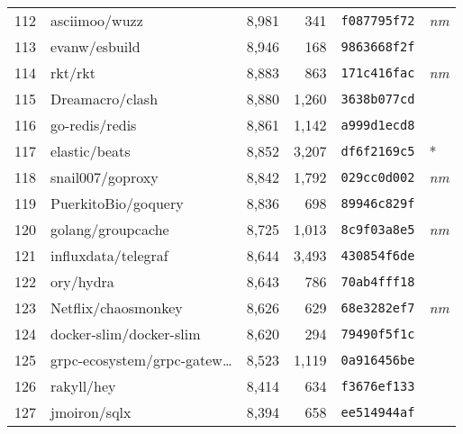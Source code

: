{\begin{supertabular}{llrrll}
        112 &                      asciimoo/wuzz &  8,981 &    341 &  \texttt{f087795f72} &  \textit{nm} \\
        113 &                      evanw/esbuild &  8,946 &    168 &  \texttt{9863668f2f} &              \\
        114 &                            rkt/rkt &  8,883 &    863 &  \texttt{171c416fac} &  \textit{nm} \\
        115 &                    Dreamacro/clash &  8,880 &  1,260 &  \texttt{3638b077cd} &              \\
        116 &                     go-redis/redis &  8,861 &  1,142 &  \texttt{a999d1ecd8} &              \\
        117 &                      elastic/beats &  8,852 &  3,207 &  \texttt{df6f2169c5} &            * \\
        118 &                   snail007/goproxy &  8,842 &  1,792 &  \texttt{029cc0d002} &  \textit{nm} \\
        119 &                PuerkitoBio/goquery &  8,836 &    698 &  \texttt{89946c829f} &              \\
        120 &                  golang/groupcache &  8,725 &  1,013 &  \texttt{8c9f03a8e5} &  \textit{nm} \\
        121 &                influxdata/telegraf &  8,644 &  3,493 &  \texttt{430854f6de} &              \\
        122 &                          ory/hydra &  8,643 &    786 &  \texttt{70ab4fff18} &              \\
        123 &                Netflix/chaosmonkey &  8,626 &    629 &  \texttt{68e3282ef7} &  \textit{nm} \\
        124 &            docker-slim/docker-slim &  8,620 &    294 &  \texttt{79490f5f1c} &              \\
        125 &    grpc-ecosystem/grpc-gatew\ldots &  8,523 &  1,119 &  \texttt{0a916456be} &              \\
        126 &                         rakyll/hey &  8,414 &    634 &  \texttt{f3676ef133} &              \\
        127 &                       jmoiron/sqlx &  8,394 &    658 &  \texttt{ee514944af} &              \\

\end{supertabular}}
